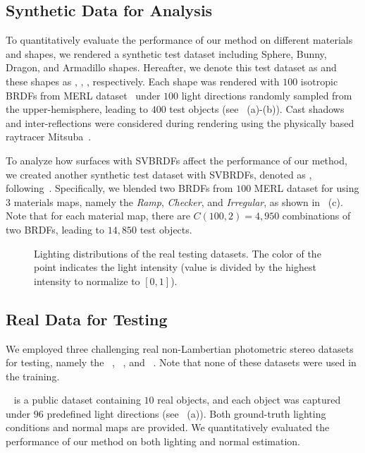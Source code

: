 \subsection{Synthetic Data for Analysis}
\label{subsec:synth_test_data}
To quantitatively evaluate the performance of our method on different materials and shapes, we rendered a synthetic test dataset including Sphere, Bunny, Dragon, and Armadillo shapes. Hereafter, we denote this test dataset as \syntestMERL and these shapes as , , ,  respectively. 
Each shape was rendered with $100$ isotropic BRDFs from MERL dataset~\cite{matusik2003merl} under $100$ light directions randomly sampled from the upper-hemisphere, leading to $400$ test objects (see ~(a)-(b)).
Cast shadows and inter-reflections were considered during rendering using the physically based raytracer Mitsuba~\cite{jakob2010mitsuba}. 

To analyze how surfaces with SVBRDFs affect the performance of our method, we created another synthetic test dataset with SVBRDFs, denoted as \dragonSVBRDF, following~\cite{goldman2010shape}.
Specifically, we blended two BRDFs from $100$ MERL dataset for  using $3$ materials maps, namely the \emph{Ramp}, \emph{Checker}, and \emph{Irregular}, as shown in ~(c). Note that for each material map, there are $C(100,2)=4,950$ combinations of two BRDFs, leading to $14,850$ test objects.

\begin{figure}[t] \centering
    
    \caption[Lighting distributions of the real testing datasets]{Lighting distributions of the real testing datasets. The color of the point indicates the light intensity (value is divided by the highest intensity to normalize to $[0,1]$).} \label{fig:light_dist}
\end{figure}

\subsection{Real Data for Testing}
We employed three challenging real non-Lambertian photometric stereo datasets for testing, namely the \emph{\diligent}~\cite{shi2019benchmark}, \emph{\gourd}~\cite{alldrin2008p}, and \emph{\lightstage}~\cite{einarsson2006relighting}. Note that none of these datasets were used in the training.

\diligent~\cite{shi2019benchmark} is a public dataset containing $10$ real objects, and each object was captured under $96$ predefined light directions (see ~(a)).  Both ground-truth lighting conditions and normal maps are provided. 
We quantitatively evaluated the performance of our method on both lighting and normal estimation.

